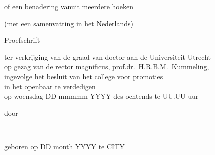 \begin{titlepage}
\begin{center}
        {\Large\titlefont\titleshape of een benadering vanuit meerdere hoeken}

        (met een samenvatting in het Nederlands)

        \bigskip
        \bigskip

        
        {\Large\titlefont Proefschrift}

        \bigskip
        \bigskip


        ter verkrijging van de graad van doctor aan de Universiteit Utrecht\\[\medskipamount]
        op gezag van de rector magnificus, prof.dr.\ H.R.B.M.~Kummeling,\\[\medskipamount]
        ingevolge het besluit van het college voor promoties\\[\medskipamount]
        in het openbaar te verdedigen\\[\medskipamount]
        op woensdag DD mmmmm YYYY  des ochtends te UU.UU uur

        \bigskip
        \bigskip

        door

        \bigskip
        \bigskip



        {\makeatletter
        \Large\titlefont\bfseries\@firstname~{\titleshape\@lastname}
        \makeatother}



        \bigskip
        \bigskip



        geboren op DD month YYYY te CITY



\end{center}
\end{titlepage}
